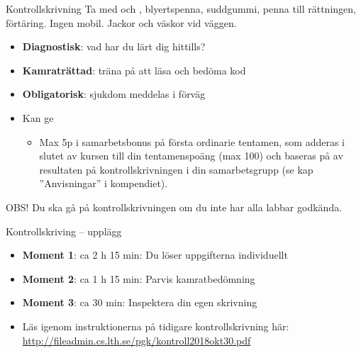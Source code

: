 


\begin{Slide}{Kontrollskrivning}
Ta med  och , blyertspenna, suddgummi,  penna till rättningen, förtäring. Ingen mobil. Jackor och väskor vid väggen.
\begin{itemize}
  \item \textbf{Diagnostisk}: vad har du lärt dig hittills?
  \item \textbf{Kamraträttad}: träna på att läsa och bedöma kod
  \item \textbf{Obligatorisk}: sjukdom  meddelas i förväg
  \item Kan ge  
  \begin{itemize}
    \item[] Max 5p i samarbetsbonus på första ordinarie tentamen, som adderas i slutet av kursen till din tentamenspoäng (max 100) och baseras på  av resultaten på kontrollskrivningen i din samarbetsgrupp (se kap ''Anvisningar'' i kompendiet).
  \end{itemize}
\end{itemize}
OBS! Du ska gå på kontrollskrivningen  om du inte har alla labbar godkända.
\end{Slide}

\begin{Slide}{Kontrollskriving -- upplägg}\SlideFontSmall
\begin{itemize}
  \item \textbf{Moment 1}: ca 2 h 15 min: Du löser uppgifterna individuellt
  \item \textbf{Moment 2}: ca 1 h 15 min: Parvis kamratbedömning
  \item \textbf{Moment 3}: ca 30 min: Inspektera din egen skrivning

\item Läs  igenom instruktionerna på tidigare kontrollskrivning här: 
\url{http://fileadmin.cs.lth.se/pgk/kontroll2018okt30.pdf}

\end{itemize}


\end{Slide}

